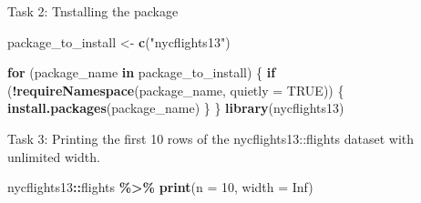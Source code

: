 \documentclass[
]{article}
\newenvironment{Shaded}{\begin{snugshade}}{\end{snugshade}}
\newcommand{\AttributeTok}[1]{\textcolor[rgb]{0.13,0.29,0.53}{#1}}
\newcommand{\ConstantTok}[1]{\textcolor[rgb]{0.56,0.35,0.01}{#1}}
\newcommand{\ControlFlowTok}[1]{\textcolor[rgb]{0.13,0.29,0.53}{\textbf{#1}}}
\newcommand{\DecValTok}[1]{\textcolor[rgb]{0.00,0.00,0.81}{#1}}
\newcommand{\FunctionTok}[1]{\textcolor[rgb]{0.13,0.29,0.53}{\textbf{#1}}}
\newcommand{\NormalTok}[1]{#1}
\newcommand{\OtherTok}[1]{\textcolor[rgb]{0.56,0.35,0.01}{#1}}
\newcommand{\SpecialCharTok}[1]{\textcolor[rgb]{0.81,0.36,0.00}{\textbf{#1}}}
\newcommand{\StringTok}[1]{\textcolor[rgb]{0.31,0.60,0.02}{#1}}
\begin{document}
Task 2: Tnstalling the package

\begin{Shaded}
\begin{Highlighting}[]
\NormalTok{package\_to\_install }\OtherTok{\textless{}{-}} \FunctionTok{c}\NormalTok{(}\StringTok{"nycflights13"}\NormalTok{)}

\ControlFlowTok{for}\NormalTok{ (package\_name }\ControlFlowTok{in}\NormalTok{ package\_to\_install) \{}
  \ControlFlowTok{if}\NormalTok{ (}\SpecialCharTok{!}\FunctionTok{requireNamespace}\NormalTok{(package\_name, }\AttributeTok{quietly =} \ConstantTok{TRUE}\NormalTok{)) \{}
    \FunctionTok{install.packages}\NormalTok{(package\_name)}
\NormalTok{  \}}
\NormalTok{\}}
\FunctionTok{library}\NormalTok{(nycflights13)}
\end{Highlighting}
\end{Shaded}

Task 3: Printing the first 10 rows of the nycflights13::flights dataset
with unlimited width.

\begin{Shaded}
\begin{Highlighting}[]
\NormalTok{nycflights13}\SpecialCharTok{::}\NormalTok{flights }\SpecialCharTok{\%\textgreater{}\%} 
  \FunctionTok{print}\NormalTok{(}\AttributeTok{n =} \DecValTok{10}\NormalTok{, }\AttributeTok{width =} \ConstantTok{Inf}\NormalTok{)}
\end{Highlighting}
\end{Shaded}
\end{document}
